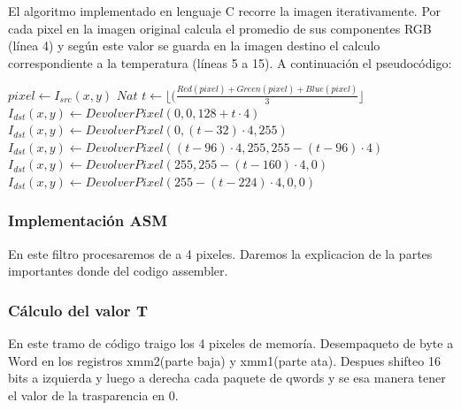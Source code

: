 El algoritmo implementado en lenguaje C recorre la imagen iterativamente. Por cada pixel en la imagen original calcula el promedio de sus componentes RGB (línea 4) y según este valor se guarda en la imagen destino el calculo correspondiente a la temperatura (líneas 5 a 15). A continuación el pseudocódigo:
	
\begin{algorithm}[H]
  \begin{algorithmic}[1]
				\STATE $ pixel \gets I_{src}(x,y)$
				\STATE $Nat $ $ t \gets \lfloor(\frac{Red(pixel)+Green(pixel)+Blue(pixel)}{3}\rfloor$
					\STATE $I_{dst}(x,y) \gets DevolverPixel(0,0,128+t \cdot 4)$
					\STATE $I_{dst}(x,y) \gets DevolverPixel(0,(t-32) \cdot 4,255)$
					\STATE $I_{dst}(x,y) \gets DevolverPixel((t-96) \cdot 4,255, 255-(t-96) \cdot 4)$
					\STATE $I_{dst}(x,y) \gets DevolverPixel(255, 255-(t-160) \cdot 4, 0)$
				\ELSE		
					\STATE $I_{dst}(x,y) \gets DevolverPixel(255-(t-224) \cdot 4, 0, 0)$
				\ENDIF	
			\ENDFOR
		 \ENDFOR
  \end{algorithmic}
  \caption{$temperature (I_{src}, I_{dst})$}
  \label{alg:temperature}
\end{algorithm}	

\subsubsection{Implementación ASM}
En este filtro procesaremos de a 4 pixeles. Daremos la explicacion de la partes importantes donde del codigo assembler.

\subsubsection*{Cálculo del valor T}

En este tramo de código traigo los 4 pixeles de memoría. Desempaqueto de byte a Word en los registros xmm2(parte baja) y xmm1(parte ata). Despues shifteo 16 bits a izquierda y luego a derecha cada paquete de qwords y se esa manera tener el valor de la trasparencia en 0.

